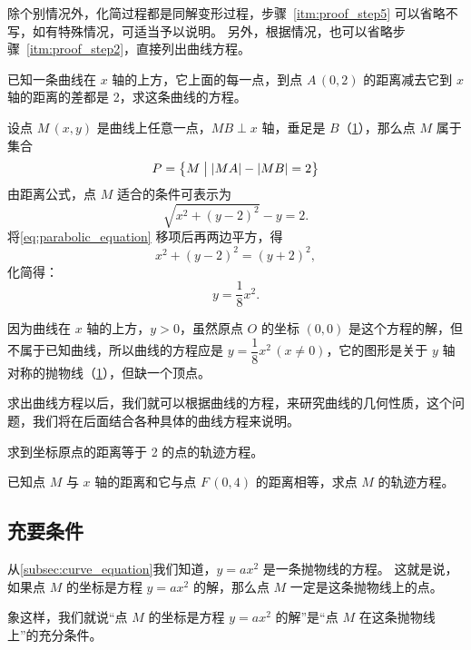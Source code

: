 除个别情况外，化简过程都是同解变形过程，步骤~\ref{itm:proof_step5} 可以省略不写，如有特殊情况，可适当予以说明。
另外，根据情况，也可以省略步骤~\ref{itm:proof_step2}，直接列出曲线方程。

\begin{example}
  已知一条曲线在 $x$ 轴的上方，它上面的每一点，到点 $A\,(0,2)$ 的距离减去它到 $x$ 轴的距离的差都是 2，求这条曲线的方程。
\end{example}
\begin{solution}
  设点 $M\,(x,y)$ 是曲线上任意一点，$MB \perp x$ 轴，垂足是 $B$（\cref{fig:2-4}），那么点 $M$ 属于集合
  \[P = \bigl\{ M\bigm||MA|-|MB|= 2\bigr\}\]
  由距离公式，点 $M$ 适合的条件可表示为
  \begin{equation}
    \label{eq:parabolic_equation}
    \sqrt{x^2+(y-2)^2}-y=2.
  \end{equation}
  将\cref{eq:parabolic_equation} 移项后再两边平方，得
  \[x^2+(y-2)^2 =(y+2)^2,\]
  化简得：
  \[y=\frac{1}{8}x^2.\]

  因为曲线在 $x$ 轴的上方，$y>0$，虽然原点 $O$ 的坐标 $(0,0)$ 是这个方程的解，但不属于已知曲线，所以曲线的方程应是 $y=\dfrac{1}{8}x^2\,(x\neq 0)$，它的图形是关于 $y$ 轴对称的抛物线（\cref{fig:2-4}），但缺一个顶点。
\end{solution}

求出曲线方程以后，我们就可以根据曲线的方程，来研究曲线的几何性质，这个问题，我们将在后面结合各种具体的曲线方程来说明。
\begin{figure}
  \caption{}\label{fig:2-4}
\end{figure}

\begin{Practice}
  \begin{question}
    \item 求到坐标原点的距离等于 2 的点的轨迹方程。
    \item 已知点 $M$ 与 $x$ 轴的距离和它与点 $F\,(0,4)$ 的距离相等，求点 $M$ 的轨迹方程。
  \end{question}
\end{Practice}

\subsection{充要条件}
从\cref{subsec:curve_equation}我们知道，$y=ax^2$ 是一条抛物线的方程。
这就是说，如果点 $M$ 的坐标是方程 $y=ax^2$ 的解，那么点 $M$ 一定是这条抛物线上的点。

象这样，我们就说“点 $M$ 的坐标是方程 $y=ax^2$ 的解”是“点 $M$ 在这条抛物线上”的充分条件。

